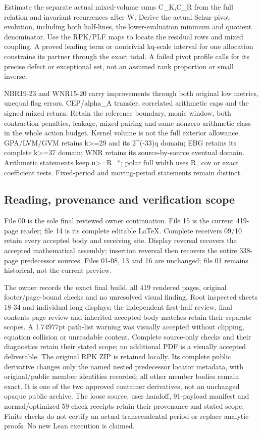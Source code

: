 \documentclass[
]{article}
\begin{document}
Estimate the separate actual mixed-volume sums C\_K,C\_R from the full
relation and invariant recurrences after W. Derive the actual
Schur-pivot evolution, including both half-lines, the lower-evaluation
minimum and quotient denominator. Use the RPK/PLF maps to locate the
residual rows and mixed coupling. A proved leading term or nontrivial
kq-scale interval for one allocation constrains its partner through the
exact total. A failed pivot profile calls for its precise defect or
exceptional set, not an assumed rank proportion or small inverse.

NBR19-23 and WNR15-20 carry improvements through both original low
metrics, unequal flag errors, CEP/alpha\_A transfer, correlated
arithmetic caps and the signed mixed return. Retain the reference
boundary, monic window, both contraction penalties, leakage, mixed
pairing and same nonzero arithmetic class in the whole action budget.
Kernel volume is not the full exterior allowance. GPA/LVM/GVM retains
k\textgreater=29 and its 2\^{}(-33)q domain; EBG retains its complete
k\textgreater=37 domain; WNR retains its source-by-source eventual
domain. Arithmetic statements keep \textbar u\textbar\textgreater=R\_*;
polar full width uses R\_cov or exact coefficient tests. Fixed-period
and moving-period statements remain distinct.

\subsection{Reading, provenance and verification
scope}\label{reading-provenance-and-verification-scope}

File 00 is the sole final reviewed owner continuation. File 15 is the
current 419-page reader; file 14 is its complete editable LaTeX.
Complete receivers 09/10 retain every accepted body and receiving site.
Display reversal recovers the accepted mathematical assembly; insertion
reversal then recovers the entire 338-page predecessor sources. Files
01-08, 13 and 16 are unchanged; file 01 remains historical, not the
current preview.

The owner records the exact final build, all 419 rendered pages,
original footer/page-bound checks and no unresolved visual finding. Root
inspected sheets 18-34 and individual long displays; the independent
first-half review, final contents-page review and inherited accepted
body matches retain their separate scopes. A 1.74977pt path-list warning
was visually accepted without clipping, equation collision or unreadable
content. Complete source-only checks and their diagnostics retain their
stated scope; no additional PDF is a visually accepted deliverable. The
original RPK ZIP is retained locally. Its complete public derivative
changes only the named nested predecessor locator metadata, with
original/public member identities recorded; all other member bodies
remain exact. It is one of the two approved container derivatives, not
an unchanged opaque public archive. The loose source, user handoff,
91-payload manifest and normal/optimized 59-check receipts retain their
provenance and stated scope. Finite checks do not certify an actual
transcendental period or replace analytic proofs. No new Lean execution
is claimed.
\end{document}
